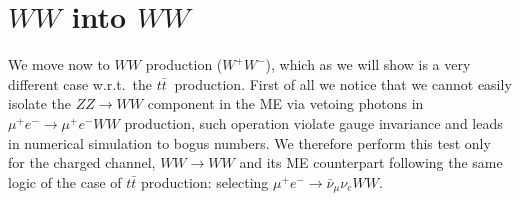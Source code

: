 \documentclass[a4paper,11pt]{article}
\begin{document}
%
%


\clearpage

\section{$WW$ into $WW$}

We move now to $WW$ production ($W^+W^-$), which as we will show is a very different case w.r.t.~the $t \bar t~$ production.
First of all we notice that we cannot easily isolate the $ZZ\to WW$ component in the ME via vetoing photons in $\mu^+e^-\to\mu^+e^- WW$ production, such operation violate gauge invariance and leads in numerical simulation to bogus numbers. We therefore perform this test only for the charged channel, $WW\to WW$ and its ME counterpart following the same logic of the case of $t \bar t$ production: selecting $\mu^+e^-\to\bar \nu_\mu \nu_e WW$.
\end{document}
